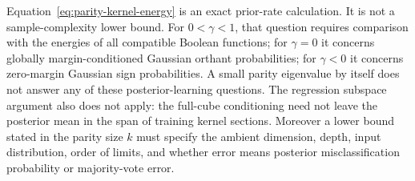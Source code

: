 Equation~\eqref{eq:parity-kernel-energy} is an exact prior-rate
calculation. It is not a sample-complexity lower bound. For
$0<\gamma<1$, that question requires comparison with the energies of
all compatible Boolean functions; for $\gamma=0$ it concerns globally
margin-conditioned Gaussian orthant probabilities; for $\gamma<0$
it concerns zero-margin Gaussian sign probabilities. A small parity
eigenvalue by itself does not answer any of these posterior-learning
questions. The regression subspace argument also does not apply: the
full-cube conditioning need not leave the posterior mean in the span
of training kernel sections. Moreover a lower bound stated in the
parity size $k$ must specify the ambient dimension, depth, input
distribution, order of limits, and whether error means posterior
misclassification probability or majority-vote error.
